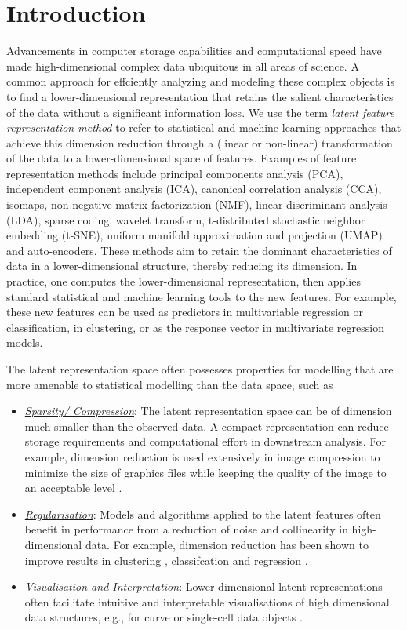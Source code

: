 \section{Introduction}

Advancements in computer storage capabilities and computational speed have made high-dimensional complex data ubiquitous in all areas of science. A common approach for effciently analyzing and modeling these complex objects is to find a lower-dimensional representation that retains the salient characteristics of the data without a significant information loss.
We use the term \emph{latent feature representation method} to refer to statistical and machine learning approaches that achieve this dimension reduction through a (linear or non-linear) transformation of the data to a lower-dimensional space of features.
Examples of feature representation methods include principal components analysis (PCA), independent component analysis (ICA), canonical correlation analysis (CCA), isomaps, non-negative matrix factorization (NMF), linear discriminant analysis (LDA), sparse coding, wavelet transform, t-distributed stochastic neighbor embedding (t-SNE), uniform manifold approximation and projection (UMAP) and auto-encoders. 
These methods aim to retain the dominant characteristics of data in a lower-dimensional structure, thereby reducing its dimension. 
In practice, one computes the lower-dimensional representation, then applies standard statistical and machine learning tools to the new features. 
For example, these new features can be used as predictors in multivariable regression or classification, in clustering, or as the response vector in multivariate regression models.

The latent representation space often possesses properties for modelling that are more amenable to statistical modelling than the data space, such as
\begin{itemize}
    \item \emph{\underline{Sparsity/ Compression}}: The latent representation space can be of dimension much smaller than the observed data. A compact representation can reduce storage requirements and computational effort in downstream analysis. For example, dimension reduction is used extensively in image compression to minimize the size of graphics files while keeping the quality of the image to an acceptable level \parencite{marcellin_overview_2000}.
    \item \emph{\underline{Regularisation}}: Models and algorithms applied to the latent features often benefit in performance from a reduction of noise and collinearity in high-dimensional data. For example, dimension reduction has been shown to improve results in clustering \parencite{niu_dimensionality_2011}, classifcation \parencite{wang_role_2014} and regression \parencite{cook_fisher_2007}.
    \item \emph{\underline{Visualisation and Interpretation}}: Lower-dimensional latent representations often facilitate intuitive and interpretable visualisations of high dimensional data structures, e.g., for curve or single-cell data objects \parencite{jones_displaying_1992, maaten_visualizing_2008, hyndman_rainbow_2010, becht_dimensionality_2019}.
\end{itemize}

